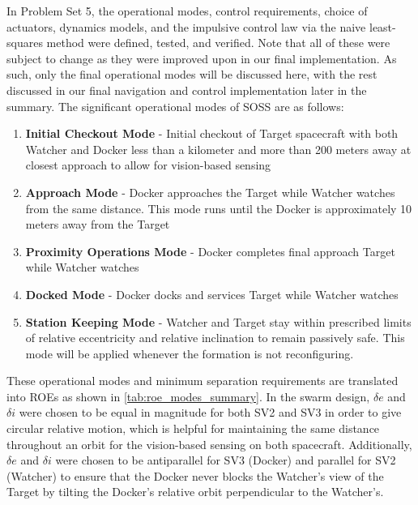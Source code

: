 In Problem Set 5, the operational modes, control requirements, choice of actuators, dynamics models, and the impulsive control law via the naive least-squares method were defined, tested, and verified. Note that all of these were subject to change as they were improved upon in our final implementation. As such, only the final operational modes will be discussed here, with the rest discussed in our final navigation and control implementation later in the summary. The significant operational modes of SOSS are as follows: 
\begin{enumerate}
\item \textbf{Initial Checkout Mode} - Initial checkout of Target spacecraft with both Watcher and Docker less than a kilometer and more than 200 meters away at closest approach to allow for vision-based sensing
\item \textbf{Approach Mode} - Docker approaches the Target while Watcher watches from the same distance. This mode runs until the Docker is approximately 10 meters away from the Target
\item \textbf{Proximity Operations Mode} - Docker completes final approach Target while Watcher watches
\item \textbf{Docked Mode} - Docker docks and services Target while Watcher watches
\item \textbf{Station Keeping Mode} - Watcher and Target stay within prescribed limits of relative eccentricity and relative inclination to remain passively safe. This mode will be applied whenever the formation is not reconfiguring. 
\end{enumerate}

These operational modes and minimum separation requirements are translated into ROEs as shown in \ref{tab:roe_modes_summary}. In the swarm design, $\delta e$ and $\delta i$ were chosen to be equal in magnitude for both SV2 and SV3 in order to give circular relative motion, which is helpful for maintaining the same distance throughout an orbit for the vision-based sensing on both spacecraft. Additionally, $\delta e$ and $\delta i$ were chosen to be antiparallel for SV3 (Docker) and parallel for SV2 (Watcher) to ensure that the Docker never blocks the Watcher's view of the Target by tilting the Docker's relative orbit perpendicular to the Watcher's.

